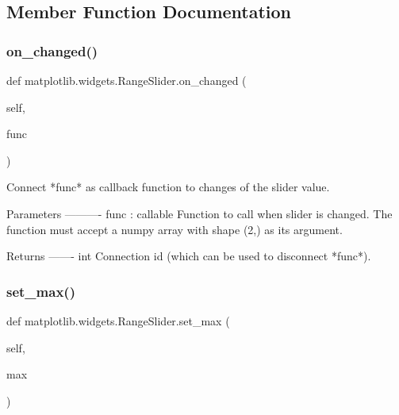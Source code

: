 \subsection{Member Function Documentation}
\mbox{\label{classmatplotlib_1_1widgets_1_1RangeSlider_ab7736352fe5054f2cbdfe4554952446a}} 
\subsubsection{\texorpdfstring{on\+\_\+changed()}{on\_changed()}}
{\footnotesize\ttfamily def matplotlib.\+widgets.\+Range\+Slider.\+on\+\_\+changed (\begin{DoxyParamCaption}\item[{}]{self,  }\item[{}]{func }\end{DoxyParamCaption})}

\begin{DoxyVerb}Connect *func* as callback function to changes of the slider value.

Parameters
----------
func : callable
    Function to call when slider is changed. The function
    must accept a numpy array with shape (2,) as its argument.

Returns
-------
int
    Connection id (which can be used to disconnect *func*).
\end{DoxyVerb}
 \mbox{\label{classmatplotlib_1_1widgets_1_1RangeSlider_a44ca2d8906994e342eb1d0083fa929b7}} 
\subsubsection{\texorpdfstring{set\+\_\+max()}{set\_max()}}
{\footnotesize\ttfamily def matplotlib.\+widgets.\+Range\+Slider.\+set\+\_\+max (\begin{DoxyParamCaption}\item[{}]{self,  }\item[{}]{max }\end{DoxyParamCaption})}

